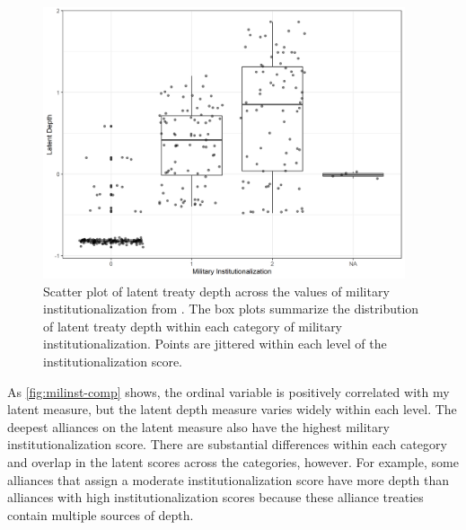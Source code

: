 \documentclass[12pt]{article}
\begin{document}
\begin{figure}[htbp]
	\centering
		\includegraphics[width=0.95\textwidth]{milinst-comp.png}
	\caption{Scatter plot of latent treaty depth across the values of military institutionalization from \citet{LeedsAnac2005}. The box plots summarize the distribution of latent treaty depth within each category of military institutionalization. Points are jittered within each level of the institutionalization score.}
	\label{fig:milinst-comp}
\end{figure} 


As \autoref{fig:milinst-comp} shows, the ordinal variable is positively correlated with my latent measure, but the latent depth measure varies widely within each level. 
The deepest alliances on the latent measure also have the highest military institutionalization score.
There are substantial differences within each category and overlap in the latent scores across the categories, however. 
For example, some alliances that \citet{LeedsAnac2005} assign a moderate institutionalization score have more depth than alliances with high institutionalization scores because these alliance treaties contain multiple sources of depth. 
\end{document}
